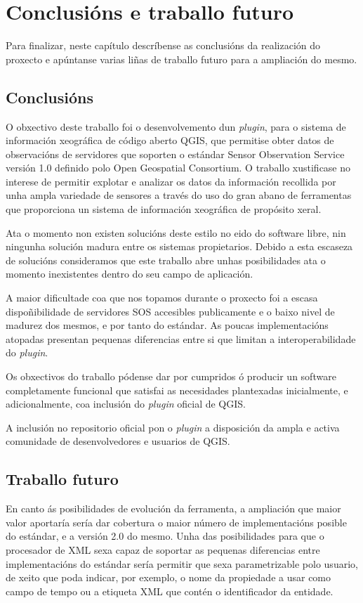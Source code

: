 \chapter{Conclusións e traballo futuro}

Para finalizar, neste capítulo descríbense as conclusións da realización do proxecto e apúntanse varias liñas de traballo futuro para a ampliación do mesmo.

\section{Conclusións}
O obxectivo deste traballo foi o desenvolvemento dun \emph{plugin}, para o sistema de información xeográfica de código aberto QGIS, que permitise obter datos de observacións de servidores que soporten o estándar Sensor Observation Service versión 1.0 definido polo Open Geospatial Consortium. O traballo xustificase no interese de permitir explotar e analizar os datos da información recollida por unha ampla variedade de sensores a través do uso do gran abano de ferramentas que proporciona un sistema de información xeográfica de propósito xeral.

Ata o momento non existen solucións deste estilo no eido do software libre, nin ningunha solución madura entre os sistemas propietarios. Debido a esta escaseza de solucións consideramos que este traballo abre unhas posibilidades ata o momento inexistentes dentro do seu campo de aplicación.

A maior dificultade coa que nos topamos durante o proxecto foi a escasa dispoñibilidade de servidores SOS accesibles publicamente e o baixo nivel de madurez dos mesmos, e por tanto do estándar. As poucas implementacións atopadas presentan pequenas diferencias entre si que limitan a interoperabilidade do \emph{plugin}.

Os obxectivos do traballo pódense dar por cumpridos ó producir un software completamente funcional que satisfai as necesidades plantexadas inicialmente, e adicionalmente, coa inclusión do \emph{plugin} oficial de QGIS.

A inclusión no repositorio oficial pon o \emph{plugin} a disposición da ampla e activa comunidade de desenvolvedores e usuarios de QGIS.

\section{Traballo futuro}
En canto ás posibilidades de evolución da ferramenta, a ampliación que maior valor aportaría sería dar cobertura o maior número de implementacións posible do estándar, e a versión 2.0 do mesmo. Unha das posibilidades para que o procesador de XML sexa capaz de soportar as pequenas diferencias entre implementacións do estándar sería permitir que sexa parametrizable polo usuario, de xeito que poda indicar, por exemplo, o nome da propiedade a usar como campo de tempo ou a etiqueta XML que contén o identificador da entidade.

